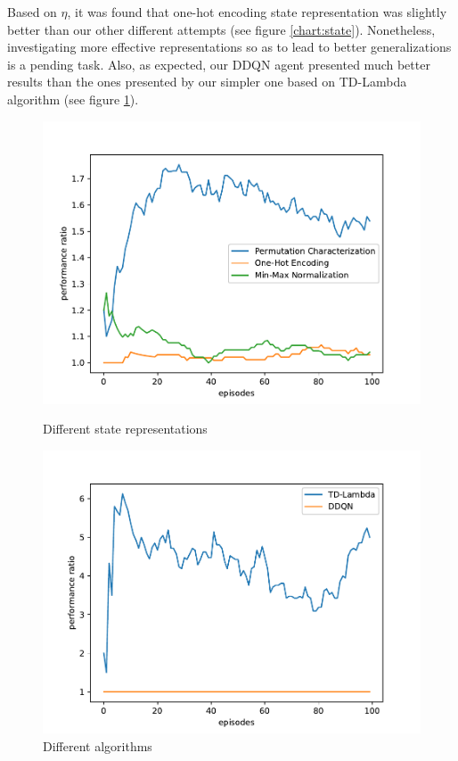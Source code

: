 \documentclass[11pt,twoside]{article}
\begin{document}
Based on $\eta$, it was found that one-hot encoding state representation was slightly better than our other different attempts (see figure \ref{chart:state}). Nonetheless, investigating more effective representations so as to lead to better generalizations is a pending task. Also, as expected, our DDQN agent presented much better results than the ones presented by our simpler one based on TD-Lambda algorithm (see figure \ref{chart:alg}).

\begin{figure}[H]
\centering
\begin{minipage}{.48\textwidth}
  \centering
	\includegraphics[scale=0.5]{charts/states_comp.pdf}
  \caption{Different state representations}
  \label{chart:state}
\end{minipage}%
\begin{minipage}{.48\textwidth}
  \centering
\includegraphics[scale=0.5]{charts/lambda_ddqn.pdf}
  \caption{Different algorithms}
  \label{chart:alg}
\end{minipage}
\end{figure}
\end{document}
